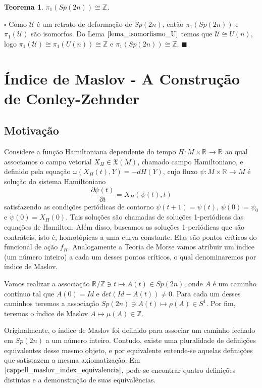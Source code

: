 \documentclass[12pt]{book}
\newtheorem{teorema}{Teorema}[section]
\newenvironment{prova}[1]{$\square$ #1}{\hfill$\blacksquare$}
\newcommand{\campohamiltoniano}[1]{X_{H}(#1)}
\newcommand{\campossuaves}[1]{\mathfrak{X}(#1)}
\newcommand{\circulo}{S^{1}}
\newcommand{\derivadaparcial}[2]{\frac{\partial #1}{\partial #2}}
\newcommand{\formaSimpletica}[2]{\omega(#1, #2)}
\newcommand{\grupofundamental}[1]{\pi_{1}(#1)}
\newcommand{\gruposimpletico}[1]{Sp(#1)}
\newcommand{\inteiros}{\mathbb{Z}}
\newcommand{\matrizSimpleticaOrtogonal}{\mathcal{U}}
\newcommand{\matrizunitaria}[1]{U(#1)}
\newcommand{\real}[1]{\mathbb{R}^{#1}}
\newcommand{\reta}{\real{}}
\begin{document}
	\begin{teorema}
		$\grupofundamental{\gruposimpletico{2n}} \cong \inteiros$.
	\end{teorema}
	\begin{prova}
		Como $\matrizSimpleticaOrtogonal$ é um retrato de deformação de $\gruposimpletico{2n}$, então $\grupofundamental{\gruposimpletico{2n}}$ e $\grupofundamental{\matrizSimpleticaOrtogonal}$ são isomorfos. Do Lema $\ref{lema_isomorfismo_U}$ temos que $\matrizSimpleticaOrtogonal\cong \matrizunitaria{n}$, logo $\grupofundamental{\matrizSimpleticaOrtogonal} \cong \grupofundamental{\matrizunitaria{n}} \cong \inteiros$ e $\grupofundamental{\gruposimpletico{2n}} \cong \inteiros$.
	\end{prova}
	
	\chapter{Índice de Maslov - A Construção de Conley-Zehnder}
	\section{Motivação}
	Considere a função Hamiltoniana dependente do tempo $H:M\times \reta\to \reta$ ao qual associamos o campo vetorial $X_{H} \in \campossuaves{M}$, chamado campo Hamiltoniano, e definido pela equação $\formaSimpletica{\campohamiltoniano{t}}{Y} = -dH(Y)$, cujo fluxo $\psi:M\times \reta \to M$ é solução do sistema Hamiltoniano
	$$
	\derivadaparcial{\psi(t)}{t} = X_{H}(\psi(t), t)
	$$
	satisfazendo as condições periódicas de contorno $\psi(t+1) = \psi(t)$, $\psi(0) = \psi_{0}$ e $\dot{\psi}(0) = \campohamiltoniano{0}$. Tais soluções são chamadas de soluções 1-periódicas das equações de Hamilton. Além disso, buscamos as soluções 1-periódicas que são contráteis, isto é, homotópicas a uma curva constante. Elas são pontos críticos do funcional de ação $f_{H}$. Analogamente a Teoria de Morse vamos atribuir um índice (um número inteiro) a cada um desses pontos críticos, o qual denominaremos por índice de Maslov.
	
	Vamos realizar a associação $\reta/\mathbb{Z} \ni t \mapsto A(t) \in \gruposimpletico{2n}$, onde $A$ é um caminho contínuo tal que $A(0) = Id$ e $det(Id - A(t))\neq 0$. Para cada um desses caminhos teremos a associação $\gruposimpletico{2n} \ni A(t) \mapsto \rho(A) \in \circulo$. Por fim, teremos o índice de Maslov $A \mapsto \mu(A) \in \inteiros$.
	
	Originalmente, o índice de Maslov foi definido para associar um caminho fechado em $\gruposimpletico{2n} $ a um número inteiro. Contudo, existe uma pluralidade de definições equivalentes desse mesmo objeto, e por equivalente entende-se aquelas definições que satistazem a mesma axiomatização. Em $\cite{cappell_maslov_index_equivalencia}$, pode-se encontrar quatro definições distintas e a demonstração de suas equivalências.
	
\end{document}
